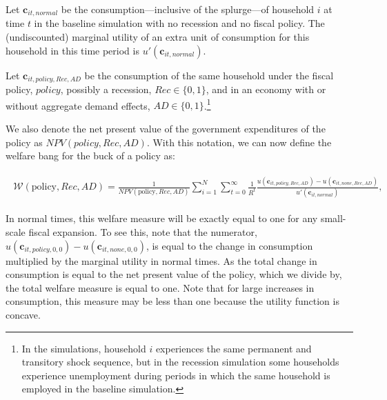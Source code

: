 Let $\mathbf{c}_{it,\textit{normal}}$ be the consumption---inclusive of the splurge---of household $i$ at time $t$ in the baseline simulation with no recession and no fiscal policy.
The (undiscounted) marginal utility of an extra unit of consumption for this household in this time period is $ u'(\mathbf{c}_{it,\textit{normal}})$.


Let $\mathbf{c}_{it,\textit{policy},Rec,AD}$ be the consumption of the same household under the fiscal policy, $\textit{policy}$, possibly a recession, $Rec \in \{0,1\}$, and in an economy with or without aggregate demand effects, $AD \in \{0,1\}$.\footnote{In the simulations, household $i$ experiences the same permanent and transitory shock sequence, but in the recession simulation some households experience unemployment during periods in which the same household is employed in the baseline simulation.}

We also denote the net present value of the government expenditures of the policy as $NPV(\textit{policy},Rec,AD)$.
With this notation, we can now define the welfare bang for the buck of a policy as:

\begin{equation}\begin{gathered}\begin{aligned} \label{welfare_def6}
	\mathcal{W}(\text{policy},Rec,AD) =\frac{1}{NPV(\text{policy},Rec,AD)}\sum_{i=1}^{N} \sum_{t=0}^{\infty} \frac{1}{R^t} \frac{u(\mathbf{c}_{it,\textit{policy},Rec,AD}) - u(\mathbf{c}_{it,\textit{none},Rec,AD})}{ u'(\mathbf{c}_{it,\textit{normal}})} ,
\end{aligned}\end{gathered}\end{equation}

In normal times, this welfare measure will be exactly equal to one for any small-scale fiscal expansion.
To see this, note that the numerator,  $u(\mathbf{c}_{it,\textit{policy},0,0}) - u(\mathbf{c}_{it,\textit{none},0,0})$, is equal to the change in consumption multiplied by the marginal utility in normal times.
As the total change in consumption is equal to the net present value of the policy, which we divide by, the total welfare measure is equal to one.
Note that for large increases in consumption, this measure may be less than one because the utility function is concave.

